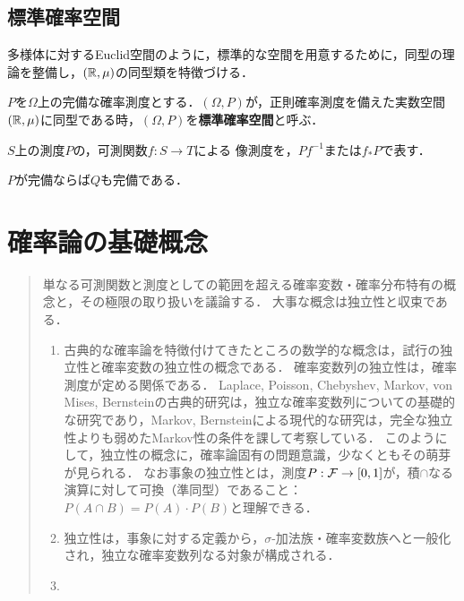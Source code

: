 \documentclass[uplatex,dvipdfmx]{jsreport}
\begin{document}
\section{標準確率空間}

\begin{tcolorbox}[colframe=ForestGreen, colback=ForestGreen!10!white,breakable,colbacktitle=ForestGreen!40!white,coltitle=black,fonttitle=\bfseries\sffamily,
title=]
    多様体に対するEuclid空間のように，標準的な空間を用意するために，同型の理論を整備し，$(\mathbb{R},\mu)$の同型類を特徴づける．
\end{tcolorbox}

\begin{definition}\label{def-canonical-measure}
    $P$を$\Omega$上の完備な確率測度とする．$(\Omega,P)$が，正則確率測度を備えた実数空間$(\mathbb{R},\mu)$に同型である時，$(\Omega,P)$を\textbf{標準確率空間}と呼ぶ．
\end{definition}

\begin{definition}
    $S$上の測度$P$の，可測関数$f:S\to T$による
    像測度を，$Pf^{-1}$または$f_*P$で表す．
\end{definition}

\begin{lemma}
    $P$が完備ならば$Q$も完備である．
\end{lemma}

\chapter{確率論の基礎概念}

\begin{quotation}
    単なる可測関数と測度としての範囲を超える確率変数・確率分布特有の概念と，その極限の取り扱いを議論する．
    大事な概念は独立性と収束である．
    \begin{enumerate}
        \item 古典的な確率論を特徴付けてきたところの数学的な概念は，試行の独立性と確率変数の独立性の概念である．
        確率変数列の独立性は，確率測度が定める関係である．
        Laplace, Poisson, Chebyshev, Markov, von Mises, Bernsteinの古典的研究は，独立な確率変数列についての基礎的な研究であり，Markov, Bernsteinによる現代的な研究は，完全な独立性よりも弱めたMarkov性の条件を課して考察している．
        このようにして，独立性の概念に，確率論固有の問題意識，少なくともその萌芽が見られる\cite{Kolmogorov}．
        なお事象の独立性とは，測度$P:\mathcal{F}\to[0,1]$が，積$\cap$なる演算に対して可換（準同型）であること：$P(A\cap B)=P(A)\cdot P(B)$と理解できる．
        \item 独立性は，事象に対する定義から，$\sigma$-加法族・確率変数族へと一般化され，独立な確率変数列なる対象が構成される．
        \item 
    \end{enumerate}
\end{quotation}
\end{document}
